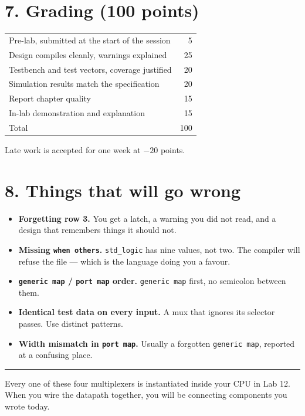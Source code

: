 \documentclass[11pt]{article}
\newcommand{\code}[1]{\texttt{#1}}
\newcommand{\hr}{\vspace{2pt}\hrule\vspace{6pt}}
\begin{document}
\section*{7. Grading (100 points)}

\begin{center}
\begin{tabular}{lr}
\toprule
Pre-lab, submitted at the start of the session & 5 \\
Design compiles cleanly, warnings explained & 25 \\
Testbench and test vectors, coverage justified & 20 \\
Simulation results match the specification & 20 \\
Report chapter quality & 15 \\
In-lab demonstration and explanation & 15 \\
\midrule
Total & 100 \\
\bottomrule
\end{tabular}
\end{center}

Late work is accepted for one week at $-20$ points.

\section*{8. Things that will go wrong}

\begin{itemize}[leftmargin=1.6em,itemsep=1pt]
\item \textbf{Forgetting row 3.} You get a latch, a warning you did not read, and
a design that remembers things it should not.
\item \textbf{Missing \code{when others}.} \code{std\_logic} has nine values, not
two. The compiler will refuse the file --- which is the language doing you a
favour.
\item \textbf{\code{generic map} / \code{port map} order.} \code{generic map}
first, no semicolon between them.
\item \textbf{Identical test data on every input.} A mux that ignores its
selector passes. Use distinct patterns.
\item \textbf{Width mismatch in \code{port map}.} Usually a forgotten
\code{generic map}, reported at a confusing place.
\end{itemize}

\vspace{10pt}
\hr
{\small Every one of these four multiplexers is instantiated inside your CPU in
Lab 12. When you wire the datapath together, you will be connecting components
you wrote today.}
\end{document}
